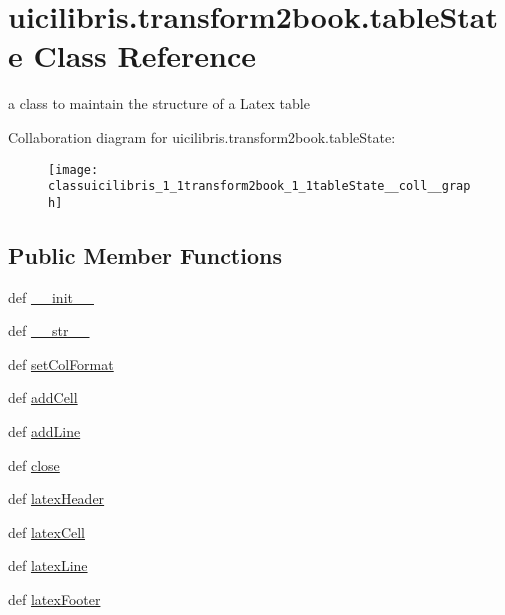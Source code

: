 \hypertarget{classuicilibris_1_1transform2book_1_1tableState}{\section{uicilibris.\-transform2book.\-table\-State \-Class \-Reference}
\label{classuicilibris_1_1transform2book_1_1tableState}
}


a class to maintain the structure of a \-Latex table  




\-Collaboration diagram for uicilibris.\-transform2book.\-table\-State\-:
\nopagebreak
\begin{figure}[H]
\begin{center}
\leavevmode
\texttt{[image: classuicilibris\_1\_1transform2book\_1\_1tableState\_\_coll\_\_graph]}
\end{center}
\end{figure}
\subsection*{\-Public \-Member \-Functions}
\begin{DoxyCompactItemize}
\item 
def \hyperlink{classuicilibris_1_1transform2book_1_1tableState_a207cca159690f55ec655e05bb6c1f910}{\-\_\-\-\_\-init\-\_\-\-\_\-}
\item 
def \hyperlink{classuicilibris_1_1transform2book_1_1tableState_a747b1c135b814bb8c5a98a3eb132b709}{\-\_\-\-\_\-str\-\_\-\-\_\-}
\item 
def \hyperlink{classuicilibris_1_1transform2book_1_1tableState_a9e344c6aa5de08786674427e4b4528f1}{set\-Col\-Format}
\item 
def \hyperlink{classuicilibris_1_1transform2book_1_1tableState_a6c4f86b941032bc0aa89b51b29638ebc}{add\-Cell}
\item 
def \hyperlink{classuicilibris_1_1transform2book_1_1tableState_af2f85dfc9f633306469f62a9e4aa8f4c}{add\-Line}
\item 
def \hyperlink{classuicilibris_1_1transform2book_1_1tableState_af02a290d62366eb2b15890e590825893}{close}
\item 
def \hyperlink{classuicilibris_1_1transform2book_1_1tableState_a5cd2ae2646ff8c2715becca7cdce1b47}{latex\-Header}
\item 
def \hyperlink{classuicilibris_1_1transform2book_1_1tableState_af7f44e5c9088ea9ff70f83efb7c4fdc8}{latex\-Cell}
\item 
def \hyperlink{classuicilibris_1_1transform2book_1_1tableState_a0b2d0a4d64010f6dbae80dfd0c7dcd71}{latex\-Line}
\item 
def \hyperlink{classuicilibris_1_1transform2book_1_1tableState_a63e41f1cc87c19a0a9a53d2dacb9edca}{latex\-Footer}
\end{DoxyCompactItemize}

